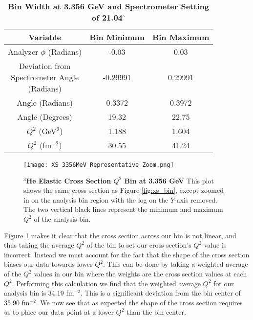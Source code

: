 \vspace{5mm}

\begin{table}[!h]
\centering
\begin{tabular}{|c | c c |}
\hline
\textbf{Variable} & \textbf{Bin Minimum} & \textbf{Bin Maximum}\\
\hline
Analyzer $\phi$ (Radians) & -0.03 & 0.03\\ 
\makecell{Deviation from \\ Spectrometer Angle \\ (Radians)} & -0.29991 & 0.29991\\
Angle (Radians) & 0.3372 &  0.3972\\
Angle (Degrees) & 19.32 & 22.75\\
$Q^2$ (GeV$^2$) & 1.188 & 1.604\\
$Q^2$ (fm$^{-2}$) & 30.55 & 41.24\\
\hline
\end{tabular}
\caption[Bin Width at 3.356 GeV and Spectrometer Setting of 21.04$^\circ$]{{\bf{Bin Width at 3.356 GeV and Spectrometer Setting of 21.04$^\circ$}} }
\label{tab:bin}
\end{table}

\begin{figure}[!ht]
\begin{center}
\texttt{[image: XS\_3356MeV\_Representative\_Zoom.png]}
\end{center}
\caption[$^3$He Elastic Cross Section $Q^2$ Bin at $E_0$ 3.356 GeV]{
{\bf{$^3$He Elastic Cross Section $Q^2$ Bin at 3.356 GeV}} This plot shows the same cross section as Figure \ref{fig:xs_bin}, except zoomed in on the analysis bin region with the log on the $Y$-axis removed. The two vertical black lines represent the minimum and maximum $Q^2$ of the analysis bin.}
\label{fig:xs_bin_zoom}
\end{figure}

Figure \ref{fig:xs_bin_zoom} makes it clear that the cross section across our bin is not linear, and thus taking the average $Q^2$ of the bin to set our cross section's $Q^2$ value is incorrect. Instead we must account for the fact that the shape of the cross section biases our data towards lower $Q^2$. This can be done by taking a weighted average of the $Q^2$ values in our bin where the weights are the cross section values at each $Q^2$. Performing this calculation we find that the weighted average $Q^2$ for our analysis bin is 34.19 fm$^{-2}$. This is a significant deviation from the bin center of 35.90 fm$^{-2}$. We now see that as expected the shape of the cross section requires us to place our data point at a lower $Q^2$ than the bin center.


